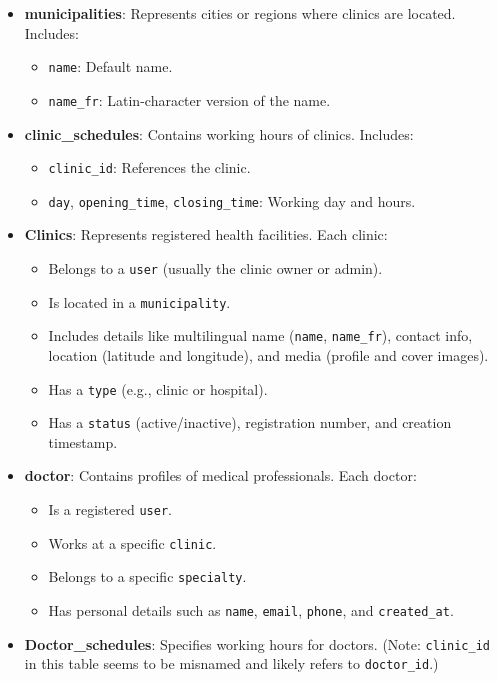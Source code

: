 \documentclass[12pt]{report}
\begin{document}
\begin{itemize}
	\item \textbf{municipalities}: Represents cities or regions where clinics are located. Includes:
	\begin{itemize}
		\item \texttt{name}: Default name.
		\item \texttt{name\_fr}: Latin-character version of the name.
	\end{itemize}

	\item \textbf{clinic\_schedules}: Contains working hours of clinics. Includes:
	\begin{itemize}
		\item \texttt{clinic\_id}: References the clinic.
		\item \texttt{day}, \texttt{opening\_time}, \texttt{closing\_time}: Working day and hours.
	\end{itemize}

	\item \textbf{Clinics}: Represents registered health facilities. Each clinic:
	\begin{itemize}
		\item Belongs to a \texttt{user} (usually the clinic owner or admin).
		\item Is located in a \texttt{municipality}.
		\item Includes details like multilingual name (\texttt{name}, \texttt{name\_fr}), contact info, location (latitude and longitude), and media (profile and cover images).
		\item Has a \texttt{type} (e.g., clinic or hospital).
		\item Has a \texttt{status} (active/inactive), registration number, and creation timestamp.
	\end{itemize}

	\item \textbf{doctor}: Contains profiles of medical professionals. Each doctor:
	\begin{itemize}
		\item Is a registered \texttt{user}.
		\item Works at a specific \texttt{clinic}.
		\item Belongs to a specific \texttt{specialty}.
		\item Has personal details such as \texttt{name}, \texttt{email}, \texttt{phone}, and \texttt{created\_at}.
	\end{itemize}

	\item \textbf{Doctor\_schedules}: Specifies working hours for doctors. (Note: \texttt{clinic\_id} in this table seems to be misnamed and likely refers to \texttt{doctor\_id}.)


\end{itemize}
\end{document}
